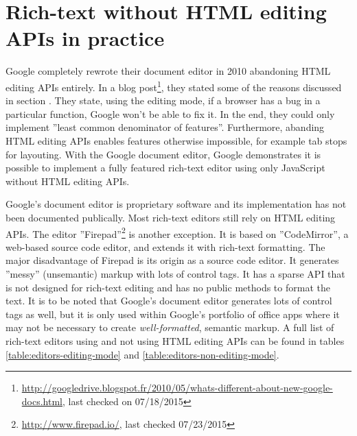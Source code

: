 \section{Rich-text without HTML editing APIs in practice} 

Google completely rewrote their document editor in 2010 abandoning HTML editing APIs entirely. In a blog post\footnote{\url{http://googledrive.blogspot.fr/2010/05/whats-different-about-new-google-docs.html}, last checked on 07/18/2015}, they stated some of the reasons discussed in section . They state, using the editing mode, if a browser has a bug in a particular function, Google won't be able to fix it. In the end, they could only implement ''least common denominator of features''. Furthermore, abanding HTML editing APIs enables features otherwise impossible, for example tab stops for layouting\cite{bw}. With the Google document editor, Google demonstrates it is possible to implement a fully featured rich-text editor using only JavaScript without HTML editing APIs.




Google's document editor is proprietary software and its implementation has not been documented publically. Most rich-text editors still rely on HTML editing APIs. The editor ''Firepad''\footnote{\url{http://www.firepad.io/}, last checked 07/23/2015} is another exception. It is based on ''CodeMirror'', a web-based source code editor, and extends it with rich-text formatting. The major disadvantage of Firepad is its origin as a source code editor. It generates ''messy'' (unsemantic) markup with lots of control tags. It has a sparse API that is not designed for rich-text editing and has no public methods to format the text. It is to be noted that Google's document editor generates lots of control tags as well, but it is only used within Google's portfolio of office apps where it may not be necessary to create \textit{well-formatted}, semantic markup. A full list of rich-text editors using and not using HTML editing APIs can be found in tables \ref{table:editors-editing-mode} and \ref{table:editors-non-editing-mode}. %


